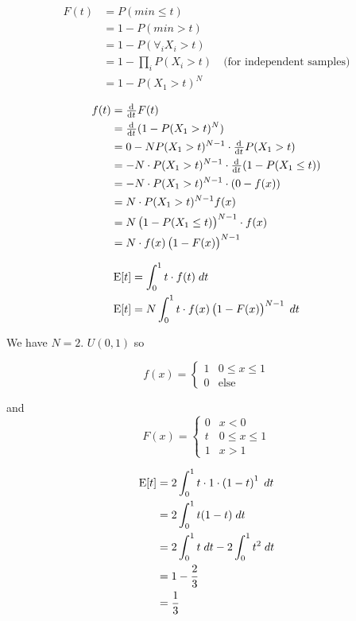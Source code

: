 \documentclass{article}
\begin{document}
\begin{align*}
  F(t) &= P(min \le t) \\
          &= 1 - P(min > t) \\
          &= 1 - P(\forall_iX_i > t) \\
          &= 1 - \prod_i P(X_i > t) \quad \text{(for independent
            samples)} \\
          &= 1 - P(X_1 > t)^N
\end{align*}

\begin{align*}
  f(t) &= \od{}{t} F(t) \\
       &= \od{}{t}(1 - P(X_1>t)^N) \\
       &= 0 - NP(X_1>t)^{N-1} \cdot \od{}{t} P(X_1>t) \\
       &= -N \cdot P(X_1>t)^{N-1} \cdot \od{}{t}(1-P(X_1 \le t)) \\
       &= -N \cdot P(X_1 > t)^{N-1} \cdot (0 - f(x)) \\
       &= N \cdot P(X_1 > t)^{N-1} f(x) \\
       &= N \left(1 - P(X_1 \le t) \right)^{N-1} \cdot f(x) \\
       &= N \cdot f(x) \left( 1 - F(x) \right)^{N-1}
\end{align*}

\begin{align*}
   \mathrm{E}[t] &= \int_0^1 t \cdot f(t) \; dt \\
   \mathrm{E}[t] &= N \int_0^1 t \cdot f(x) \left( 1 - F(x) \right)^{N-1}
           \; dt \\
\end{align*}

We have $N = 2$. $U(0,1)$ so

\[
f(x) = 
\left\{
  \begin{array}{ll}
    1 & 0 \le x \le 1 \\
    0 & \text{else}
  \end{array}
\right.
\]

and
\[ 
F(x) =
\left\{
  \begin{array}{ll}
    0 & x < 0 \\
    t & 0 \le x \le 1 \\
    1 & x > 1
  \end{array}
\right.
\]

\begin{align*}
         \mathrm{E}[t] &= 2 \int_0^1 t \cdot 1 \cdot \left( 1 - t \right)^1 \;
                 dt \\
               &= 2 \int_0^1 t(1-t) \; dt \\
               &= 2 \int_0^1{t \; dt} - 2 \int_0^1{t^2 \; dt} \\
               &= 1 - \frac{2}{3} \\
               &= \frac{1}{3}
\end{align*}
\end{document}
